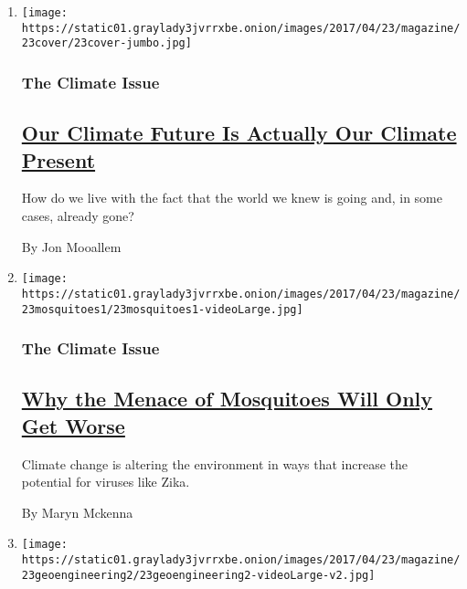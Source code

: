 \begin{enumerate}
\def\labelenumi{\arabic{enumi}.}
\item
  \texttt{[image: https://static01.graylady3jvrrxbe.onion/images/2017/04/23/magazine/23cover/23cover-jumbo.jpg]}

  \hypertarget{the-climate-issue}{%
  \subsubsection{The Climate Issue}\label{the-climate-issue}}

  \hypertarget{our-climate-future-is-actually-our-climate-present}{%
  \subsection{\texorpdfstring{\href{/2017/04/19/magazine/our-climate-future-is-actually-our-climate-present.html}{Our
  Climate Future Is Actually Our Climate
  Present}}{Our Climate Future Is Actually Our Climate Present}}\label{our-climate-future-is-actually-our-climate-present}}

  How do we live with the fact that the world we knew is going and, in
  some cases, already gone?

  By Jon Mooallem
\item
  \texttt{[image: https://static01.graylady3jvrrxbe.onion/images/2017/04/23/magazine/23mosquitoes1/23mosquitoes1-videoLarge.jpg]}

  \hypertarget{the-climate-issue-1}{%
  \subsubsection{The Climate Issue}\label{the-climate-issue-1}}

  \hypertarget{why-the-menace-of-mosquitoes-will-only-get-worse}{%
  \subsection{\texorpdfstring{\href{/2017/04/20/magazine/why-the-menace-of-mosquitoes-will-only-get-worse.html}{Why
  the Menace of Mosquitoes Will Only Get
  Worse}}{Why the Menace of Mosquitoes Will Only Get Worse}}\label{why-the-menace-of-mosquitoes-will-only-get-worse}}

  Climate change is altering the environment in ways that increase the
  potential for viruses like Zika.

  By Maryn Mckenna
\item
  \texttt{[image: https://static01.graylady3jvrrxbe.onion/images/2017/04/23/magazine/23geoengineering2/23geoengineering2-videoLarge-v2.jpg]}


\end{enumerate}
